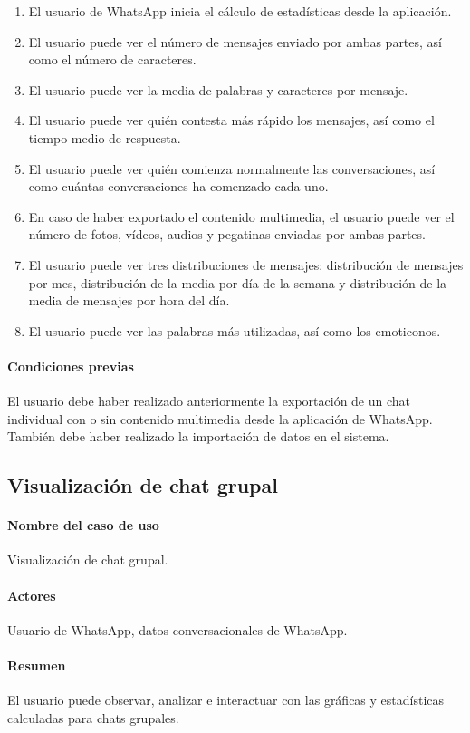 \begin{enumerate}
	\item El usuario de WhatsApp inicia el cálculo de estadísticas desde la aplicación.
	\item El usuario puede ver el número de mensajes enviado por ambas partes, así como el número de caracteres.
	\item El usuario puede ver la media de palabras y caracteres por mensaje.
	\item El usuario puede ver quién contesta más rápido los mensajes, así como el tiempo medio de respuesta.
	\item El usuario puede ver quién comienza normalmente las conversaciones, así como cuántas conversaciones ha comenzado cada uno.
	\item En caso de haber exportado el contenido multimedia, el usuario puede ver el número de fotos, vídeos, audios y pegatinas enviadas por ambas partes.
	\item El usuario puede ver tres distribuciones de mensajes: distribución de mensajes por mes, distribución de la media por día de la semana y distribución de la media de mensajes por hora del día.
	\item El usuario puede ver las palabras más utilizadas, así como los emoticonos.
\end{enumerate}

\paragraph{Condiciones previas} El usuario debe haber realizado anteriormente la exportación de un chat individual con o sin contenido multimedia desde la aplicación de WhatsApp. También debe haber realizado la importación de datos en el sistema.

\subsection{Visualización de chat grupal}

\paragraph{Nombre del caso de uso} Visualización de chat grupal.
\paragraph{Actores} Usuario de WhatsApp, datos conversacionales de WhatsApp.
\paragraph{Resumen} El usuario puede observar, analizar e interactuar con las gráficas y estadísticas calculadas para chats grupales.
